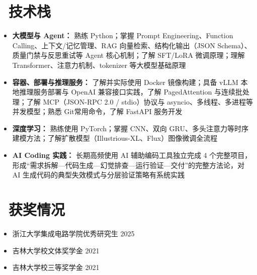 \documentclass[11pt]{article}
\begin{document}
\section{\makebox[\widthof{\faCogs}][c]{\color{CVBlue}\faCogs}\ 技术栈}
\begin{itemize}[nosep]
    \item \textbf{大模型与 Agent：} 熟练 Python；掌握 Prompt Engineering、Function Calling、上下文/记忆管理、RAG 向量检索、结构化输出（JSON Schema）、质量门禁与反思重试等 Agent 核心机制；了解 SFT/LoRA 微调原理；理解 Transformer、注意力机制、tokenizer 等大模型基础原理
    \item \textbf{容器、部署与推理服务：} 了解并实际使用 Docker 镜像构建；具备 vLLM 本地推理服务部署与 OpenAI 兼容接口实践，了解 PagedAttention 与连续批处理；了解 MCP（JSON-RPC 2.0 / stdio）协议与 asyncio、多线程、多进程等并发模型；熟悉 Git常用命令，了解 FastAPI 服务开发
    \item \textbf{深度学习：} 熟练使用 PyTorch；掌握 CNN、双向 GRU、多头注意力等时序建模方法；了解扩散模型（Illustrious-XL、Flux）图像微调全流程
    \item \textbf{AI Coding 实践：} 长期高频使用 AI 辅助编码工具独立完成 4 个完整项目，形成“需求拆解—代码生成—幻觉排查—运行验证—交付”的完整方法论，对 AI 生成代码的典型失效模式与分层验证策略有系统实践
\end{itemize}

\section{\makebox[\widthof{\faList}][c]{\color{CVBlue}\faList}\ 获奖情况}
\begin{itemize}
    \item 浙江大学集成电路学院优秀研究生 \hfill 2025
    \item 吉林大学校文体奖学金 \hfill 2021
    \item 吉林大学校三等奖学金 \hfill 2021
\end{itemize}
\end{document}
